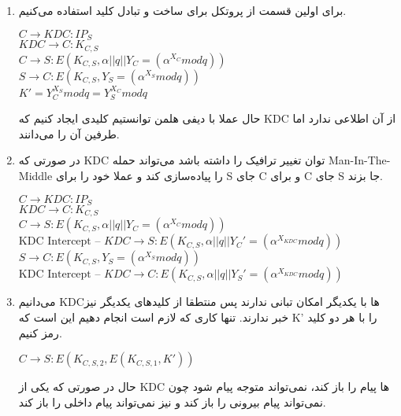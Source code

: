 \begin{enumerate}[label=\alph*)]
  \item 
برای اولین قسمت از پروتکل 
برای ساخت و تبادل کلید استفاده می‌کنیم.
\begin{latin}
  $C \rightarrow KDC: IP_S$\\
  $KDC \rightarrow C: K_{C,S}$\\
  $C \rightarrow S: E(K_{C,S},\alpha || q || Y_C = (\alpha^{X_C} mod q))$\\
  $S \rightarrow C: E(K_{C,S}, Y_S = (\alpha^{X_S} mod q))$\\
  $K' = Y_C ^ {X_S} modq = Y_S ^ {X_C} modq$
\end{latin}
حال عملا با دیفی هلمن توانستیم 
کلیدی ایجاد کنیم که KDC 
از آن اطلاعی ندارد اما طرفین آن را می‌دانند.
\item 
در صورتی که KDC 
توان تغییر ترافیک را داشته باشد می‌تواند حمله Man-In-The-Middle
را پیاده‌سازی کند و عملا خود را برای S جای C و برای C جای S جا بزند.
\begin{latin}
  $C \rightarrow KDC: IP_S$\\
  $KDC \rightarrow C: K_{C,S}$\\
  $C \rightarrow S: E(K_{C,S},\alpha || q || Y_C = (\alpha^{X_C} mod q))$\\
  $\text{KDC Intercept -- }KDC \rightarrow S: E(K_{C,S},\alpha || q || Y_C' = (\alpha^{X_{KDC}} mod q))$\\
  $S \rightarrow C: E(K_{C,S}, Y_S = (\alpha^{X_S} mod q))$\\
  $\text{KDC Intercept -- }KDC \rightarrow C: E(K_{C,S},\alpha || q || Y_S' = (\alpha^{X_{KDC}} mod q))$\\
\end{latin}


\item 
می‌دانیم KDCها
با یکدیگر امکان تبانی ندارند پس منتطقا از کلید‌های یکدیگر نیز خبر ندارند.
تنها کاری که لازم است انجام دهیم این است که K'
را با هر دو کلید رمز کنیم.
\begin{latin}
  $C \rightarrow S: E(K_{C,S,2},E(K_{C,S,1},K'))$\\
\end{latin}
حال در صورتی که یکی از KDC
ها 
پیام را باز کند، نمی‌تواند متوجه پیام شود چون 
نمی‌تواند پیام بیرونی را باز کند و 
نیز نمی‌تواند پیام داخلی را باز کند.
\end{enumerate}